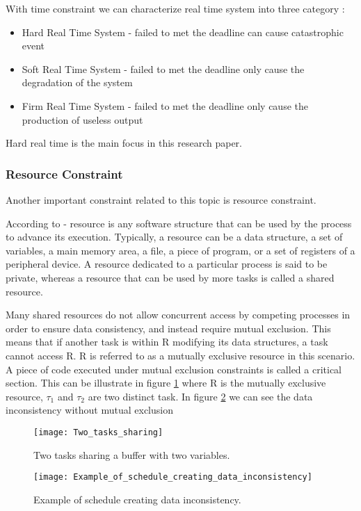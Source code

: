 With time constraint we can characterize real time system into three category :
\begin{itemize}
\item Hard Real Time System - failed to met the deadline can cause catastrophic event 
\item Soft Real Time System - failed to met the deadline only cause the degradation of the system 
\item Firm Real Time System - failed to met the deadline only cause the production of useless output 
\end{itemize}

Hard real time is the main focus in this research paper.
\subsubsection{Resource Constraint}

Another important constraint related to this topic is resource constraint. 

According to \cite{b5} - resource is any software structure that can be used by the process to advance its execution. Typically, a resource can be a data structure, a set of variables, a main memory area, a file, a piece of program, or a set of registers of a peripheral device. A resource dedicated to a particular process is said to be private, whereas a resource that can be used by more tasks is called a shared resource.

Many shared resources do not allow concurrent access by competing processes in order to ensure data consistency, and instead require mutual exclusion. This means that if another task is within R modifying its data structures, a task cannot access R. R is referred to as a mutually exclusive resource in this scenario.  A piece of code executed under mutual exclusion constraints is called a critical section. This can be illustrate in figure \ref{fig:Two_tasks_sharing} where R is the mutually exclusive resource, $ \tau_{1} $ and $\tau_{2} $ are two distinct task.
In figure \ref{fig:Example_of_schedule_creating_data_inconsistency} we can see the data inconsistency without mutual exclusion
\begin{figure}[h]
    \centering
    \texttt{[image: Two\_tasks\_sharing]}
    \caption{ Two tasks sharing a buffer with two variables. \cite{b5}}
    \label{fig:Two_tasks_sharing}
\end{figure}

\begin{figure}[h]
    \centering
    \texttt{[image: Example\_of\_schedule\_creating\_data\_inconsistency]}
    \caption{Example of schedule creating data inconsistency. \cite{b5}}
    \label{fig:Example_of_schedule_creating_data_inconsistency}
\end{figure}

